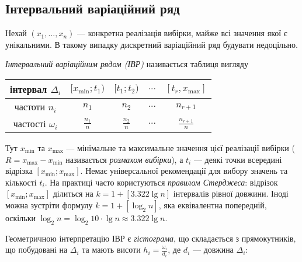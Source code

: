 \subsection{Інтервальний варіаційний ряд}
Нехай $\left(x_1, ... ,x_n\right)$ --- конкретна реалізація вибірки, майже всі значення якої є унікальними. В такому випадку
дискретний варіаційний ряд будувати недоцільно.
\begin{definition}
    \emph{Інтервальний варіаційним рядом (ІВР)} називається таблиця вигляду
    \begin{center}
        \begin{tabular}{|c|c|c|c|c|}
            \hline
            інтервал $\Delta_i$ & $[x_{\min}; t_1)$ & $[t_1; t_2)$ & $...$ & $[t_r, x_{\max}]$ \\
            \hline
            частоти $n_i$ & $n_1$ & $n_2$ & $...$ & $n_{r+1}$ \\
            \hline
            частості $\omega_i$ & $\frac{n_1}{n}$ & $\frac{n_2}{n}$ & $...$ & $\frac{n_{r+1}}{n}$ \\
            \hline
        \end{tabular}
        \end{center}
        Тут $x_{\min}$ та $x_{\max}$ --- мінімальне та максимальне значення цієї реалізації вибірки ($R = x_{\max} - x_{\min}$ називається \emph{розмахом вибірки}), а $t_i$ --- деякі точки всередині відрізка 
        $[x_{\min}; x_{\max}]$. Немає універсальної рекомендації для вибору значень та кількості $t_i$. На практиці часто користуються \emph{правилом Стерджеса}:
        відрізок $[x_{\min}; x_{\max}]$ ділиться на $k = 1 + \left[ 3.322 \lg n\right]$ інтервалів рівної довжини. Іноді можна зустріти формулу
        $k = 1 + \left[\log_2 n\right]$, яка еквівалентна попередній, оскільки $\log_2 n = \log_2 10 \cdot \lg n \approx 3.322 \lg n$.
\end{definition}
Геометричною інтерпретацію ІВР є \emph{гістограма}, що складається з прямокутників, що побудовані на $\Delta_i$ та мають висоти $h_i = \frac{\omega_i}{d_i}$, де $d_i$ --- довжина $\Delta_i$:
\begin{center}
\end{center}

